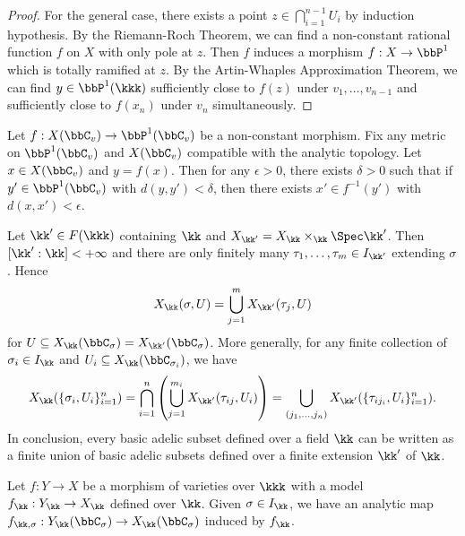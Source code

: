 \begin{proof}
        For the general case, there exists a point \(z \in \bigcap_{i=1}^{n-1} U_i\) by induction hypothesis.
        By the Riemann-Roch Theorem, we can find a non-constant rational function \(f\) on \(X\) with only pole at \(z\).
        Then \(f\) induces a morphism \(f: X \to \bbP^1\) which is totally ramified at \(z\).
        By the Artin-Whaples Approximation Theorem, we can find \(y \in \bbP^1(\kkk)\) sufficiently close to \(f(z)\) under \(v_1,\ldots,v_{n-1}\) and sufficiently close to \(f(x_n)\) under \(v_n\) simultaneously.

    \end{proof}

    \begin{lemma}\label{lem:image_sufficiently_closed_implies_preimage_sufficiently_closed}
        Let \(f: X(\bbC_v) \to \bbP^1(\bbC_v)\) be a non-constant morphism.
        Fix any metric on \(\bbP^1(\bbC_v)\) and \(X(\bbC_v)\) compatible with the analytic topology.
        Let \(x \in X(\bbC_v)\) and \(y = f(x)\).
        Then for any \(\epsilon > 0\), there exists \(\delta > 0\) such that if \(y' \in \bbP^1(\bbC_v)\) with \(d(y,y') < \delta\), then there exists \(x' \in f^{-1}(y')\) with \(d(x,x') < \epsilon\).
    \end{lemma}


    Let \(\kk' \in F(\kkk)\) containing \(\kk\) and \(X_{\kk'} = X_\kk \times_{\kk} \Spec \kk'\).
    Then \([\kk':\kk] < +\infty\) and there are only finitely many \(\tau_1,\ldots,\tau_m \in I_{\kk'}\) extending \(\sigma\).
    Hence 
    \[ X_\kk(\sigma,U) = \bigcup_{j=1}^m X_{\kk'}(\tau_j,U) \]
    for \(U \subseteq X_{\kk}(\bbC_\sigma) = X_{\kk'}(\bbC_\sigma)\).
    More generally, for any finite collection of \(\sigma_i \in I_\kk\) and \(U_i \subseteq X_{\kk}(\bbC_{\sigma_i})\), we have
    \[ X_\kk(\{\sigma_i,U_i\}_{i=1}^n) = \bigcap_{i=1}^n \left( \bigcup_{j=1}^{m_i} X_{\kk'}(\tau_{ij},U_i) \right) = \bigcup_{(j_1,\ldots,j_n)} X_{\kk'}(\{\tau_{ij_i},U_i\}_{i=1}^n). \]
    In conclusion, every basic adelic subset defined over a field \(\kk\) can be written as a finite union of basic adelic subsets defined over a finite extension \(\kk'\) of \(\kk\).
    
    Let \(f: Y \to X\) be a morphism of varieties over \(\kkk\) with a model \(f_\kk: Y_\kk \to X_\kk\) defined over \(\kk\).
    Given \(\sigma \in I_\kk\), we have an analytic map \(f_{\kk,\sigma}: Y_{\kk}(\bbC_\sigma) \to X_{\kk}(\bbC_\sigma)\) induced by \(f_\kk\).
    \Yang{}

